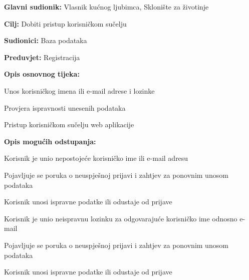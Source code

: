 					\noindent {}
					\begin{packed_item}
						
						\item \textbf{Glavni sudionik: }Vlasnik kućnog ljubimca, Sklonište za životinje
						\item  \textbf{Cilj:} Dobiti pristup korisničkom sučelju
						\item  \textbf{Sudionici:} Baza podataka
						\item  \textbf{Preduvjet:} Registracija
						\item  \textbf{Opis osnovnog tijeka:}
						
						\item[] \begin{packed_enum}
							
							\item Unos korisničkog imena ili e-mail adrese i lozinke
							\item Provjera ispravnosti unesenih podataka
							\item Pristup korisničkom sučelju web aplikacije
						\end{packed_enum}
						
						\item  \textbf{Opis mogućih odstupanja:}
						
						\item[] \begin{packed_item}
							
							\item[2.a] Korisnik je unio nepostojeće korisničko ime ili e-mail adresu
							\item[] \begin{packed_enum}
								
								\item Pojavljuje se poruka o neuspješnoj prijavi i zahtjev za ponovnim unosom podataka
								\item Korisnik unosi ispravne podatke ili odustaje od prijave
								
							\end{packed_enum}
							\item[2.b] Korisnik je unio neispravnu lozinku za odgovarajuće korisničko ime odnosno e-mail
							\item[] \begin{packed_enum}
								
								\item Pojavljuje se poruka o neuspješnoj prijavi i zahtjev za ponovnim unosom podataka
								\item Korisnik unosi ispravne podatke ili odustaje od prijave
								
							\end{packed_enum}
							
						\end{packed_item}
					\end{packed_item}

